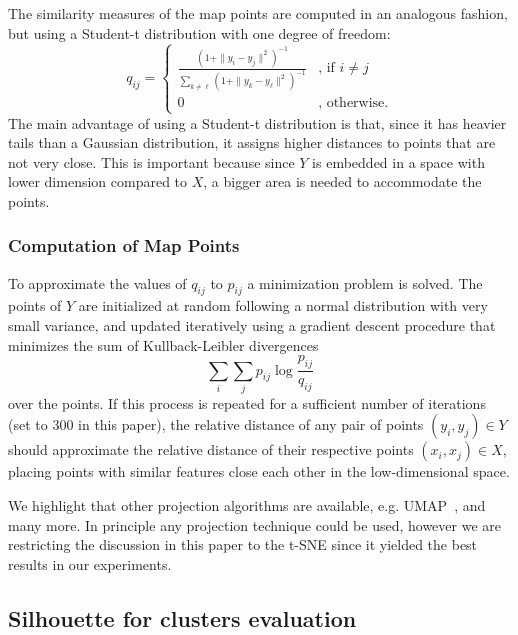 \documentclass[sn-basic]{sn-jnl}%
\theoremstyle{thmstyleone}%
\theoremstyle{thmstyletwo}%
\theoremstyle{thmstylethree}%
\begin{document}
The similarity measures of the map points are computed in an analogous fashion, but using a Student-t distribution with one degree of freedom:
\begin{equation}
	\label{eq:q_ij_tsne}
	q_{ij} =
	\begin{cases}
	\frac{(1 + \| y_i - y_j\|^2)^{-1}}
	{\sum\limits_{k \neq \ell} (1 + \| y_k - y_\ell\|^2)^{-1}} & \text{, if } i \neq j\\
	0 & \text{, otherwise.}
	\end{cases}
\end{equation}
The main advantage of using a Student-t distribution is that, since it has heavier tails than a Gaussian distribution, it assigns higher distances to points that are not very close. This is important because since $Y$ is embedded in a space with lower dimension compared to $X$, a bigger area is needed to accommodate the points.

\subsubsection{Computation of Map Points}

To approximate the values of $q_{ij}$ to $p_{ij}$ a minimization problem is solved. The points of $Y$ are initialized at random following a normal distribution with very small variance, and updated iteratively using a gradient descent procedure that minimizes the sum of Kullback-Leibler divergences
\begin{equation}
	\label{eq:c}
	\sum\limits_{i} \sum\limits_{j} p_{ij} \log \frac{p_{ij}}{q_{ij}}
\end{equation}
over the points. If this process is repeated for a sufficient number of iterations (set to 300 in this paper), the relative distance of any pair of points $(y_i, y_j) \in Y$ should approximate the relative distance of their respective points $(x_i, x_j) \in X$, placing points with similar features close each other in the low-dimensional space.

We highlight that other projection algorithms are available, e.g. UMAP~\citep{umap-paper}, and many more. In principle any projection technique could be used, however we are restricting the discussion in this paper to the t-SNE since it yielded the best results in our experiments.


\subsection{Silhouette for clusters evaluation}
\end{document}
